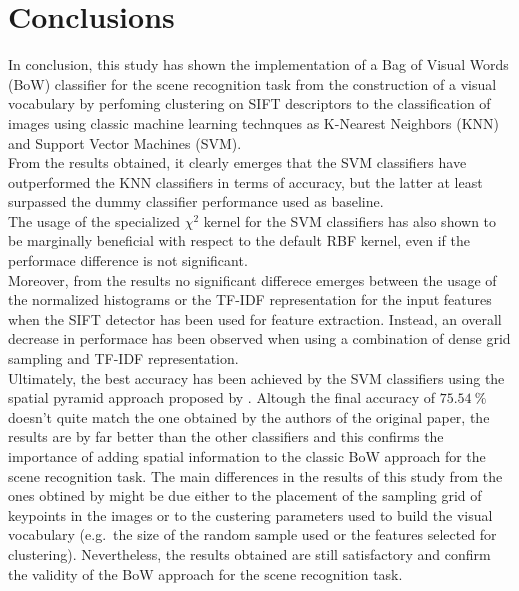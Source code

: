 \documentclass[../main.tex]{subfiles}
\begin{document}
\section{Conclusions}\label{sec:conclusions}

In conclusion, this study has shown the implementation of a Bag of Visual Words (BoW) classifier for the scene recognition task from the construction of a visual vocabulary by perfoming clustering on SIFT descriptors to the classification of images using classic machine learning technques as K-Nearest Neighbors (KNN) and Support Vector Machines (SVM).\\
From the results obtained, it clearly emerges that the SVM classifiers have outperformed the KNN classifiers in terms of accuracy, but the latter at least surpassed the dummy classifier performance used as baseline.\\
The usage of the specialized $\chi^2$ kernel for the SVM classifiers has also shown to be marginally beneficial with respect to the default RBF kernel, even if the performace difference is not significant.\\
Moreover, from the results no significant differece emerges between the usage of the normalized histograms or the TF-IDF representation for the input features when the SIFT detector has been used for feature extraction. Instead, an overall decrease in performace has been observed when using a combination of dense grid sampling and TF-IDF representation.\\ 
Ultimately, the best accuracy has been achieved by the SVM classifiers using the spatial pyramid approach proposed by .
Altough the final accuracy of $\SI{75.54}{\percent}$ doesn't quite match the one obtained by the authors of the original paper, the results are by far better than the other classifiers and this confirms the importance of adding spatial information to the classic BoW approach for the scene recognition task.
The main differences in the results of this study from the ones obtined by  might be due either to the placement of the sampling grid of keypoints in the images or to the custering parameters used to build the visual vocabulary (e.g.\ the size of the random sample used or the features selected for clustering). Nevertheless, the results obtained are still satisfactory and confirm the validity of the BoW approach for the scene recognition task.
\end{document}
